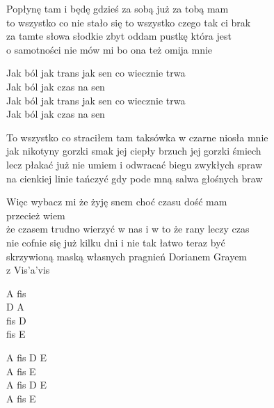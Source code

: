 \begin{textn}
    Popłynę tam i będę gdzieś za sobą już za tobą mam\\
    to wszystko co nie stało się to wszystko czego tak ci brak\\
    za tamte słowa słodkie zbyt oddam pustkę która jest\\
    o samotności nie mów mi bo ona też omija mnie

    Jak ból jak trans jak sen co wiecznie trwa\\
    Jak ból jak czas na sen\\
    Jak ból jak trans jak sen co wiecznie trwa\\
    Jak ból jak czas na sen

    To wszystko co straciłem tam taksówka w czarne niosła mnie\\
    jak nikotyny gorzki smak jej ciepły brzuch jej gorzki śmiech\\
    lecz płakać już nie umiem i odwracać biegu zwykłych spraw\\
    na cienkiej linie tańczyć gdy pode mną salwa głośnych braw

    Więc wybacz mi że żyję snem choć czasu dość mam\\
    przecież wiem\\
    że czasem trudno wierzyć w nas i w to że rany leczy czas\\
    nie cofnie się już kilku dni i nie tak łatwo teraz być\\
    skrzywioną maską własnych pragnień Dorianem Grayem\\
    z Vis'a'vis
    
\end{textn}
\begin{chord}
    \footnotesize{
    A fis\\
    D A\\
    fis D\\
    fis E

    A fis D E\\
    A fis E\\
    A fis D E\\
    A fis E
    }
\end{chord}